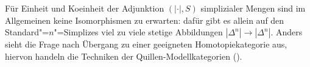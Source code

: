 \begin{bem}
  Für Einheit und Koeinheit der Adjunktion $(|\cdot|, S)$ simplizialer
  Mengen sind im Allgemeinen keine Isomorphismen zu erwarten: dafür
  gibt es allein auf den Standard"=$n$"=Simplizes viel zu viele
  stetige Abbildungen $|\Delta^n| \to |\Delta^n|$. Anders sieht die
  Frage nach Übergang zu einer geeigneten Homotopiekategorie aus,
  hiervon handeln die Techniken der Quillen-Modellkategorien
  (\cite{GJ}).
\end{bem}
